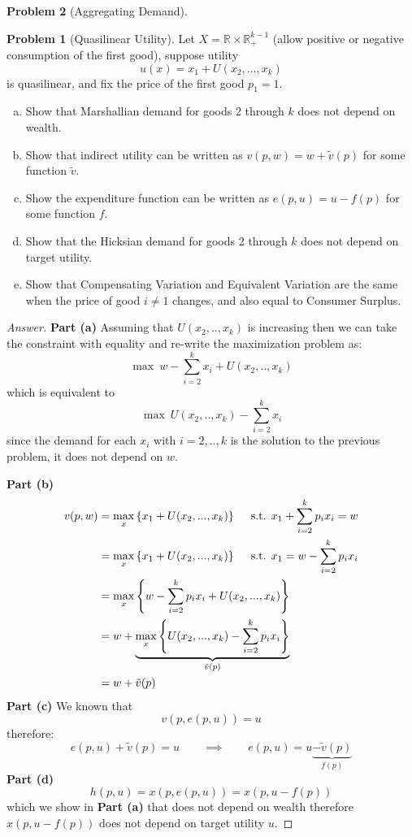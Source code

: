 \documentclass{article}
\theoremstyle{definition}
\newtheorem{problem}{Problem}
\newcommand{\qiq}{\qquad \implies \qquad}
\begin{document}
\begin{problem}[Aggregating Demand]
\begin{problem}[Quasilinear Utility]
Let $X=\mathbb{R} \times \mathbb{R}_{+}^{k-1}$ (allow positive or negative consumption of the first good), suppose utility
$$
u(x)=x_{1}+U\left(x_{2}, \ldots, x_{k}\right)
$$
is quasilinear, and fix the price of the first good $p_{1}=1$.
\begin{enumerate}[(a)]
    \item  Show that Marshallian demand for goods 2 through $k$ does not depend on wealth.
    \item Show that indirect utility can be written as $v(p, w)=w+\tilde{v}(p)$ for some function $\tilde{v}$.
 \item Show the expenditure function can be written as $e(p, u)=u-f(p)$ for some function $f$.
 \item Show that the Hicksian demand for goods 2 through $k$ does not depend on target utility.
 \item Show that Compensating Variation and Equivalent Variation are the same when the price of
    good $i \neq 1$ changes, and also equal to Consumer Surplus.
\end{enumerate}
\end{problem}
\begin{proof}[Answer]
\textbf{Part (a)}
Assuming that $U(x_2,..,x_k)$ is increasing then we can take the constraint with equality and re-write the maximization problem as:
$$\max \: w - \sum_{i=2}^kx_i + U(x_2,..,x_k) $$
which is equivalent to
$$\max \: U(x_2,..,x_k)  - \sum_{i=2}^kx_i $$
since the demand for each $x_i$ with $i=2,..,k$ is the solution to the previous problem, it does not depend on $w$.

\textbf{Part (b)}
\begin{align*}
    v(p,w)&=\max_x\left\{x_1 + U(x_2,...,x_k)\right\} \quad \text{ s.t. } x_1 + \sum_{i=2}^kp_ix_i = w \\
          &=\max_x\left\{x_1 + U(x_2,...,x_k)\right\} \quad \text{ s.t. } x_1  = w -\sum_{i=2}^kp_ix_i\\
          &=\max_x\left\{w -\sum_{i=2}^kp_ix_i + U(x_2,...,x_k)\right\}\\
          &= w + \underbrace{\max_x\left\{ U(x_2,...,x_k) -\sum_{i=2}^kp_ix_i\right\}}_{\Bar{v}(p)}\\
          & = w+\tilde{v}(p)
\end{align*}
\textbf{Part (c)}
We known that
$$v(p,e(p,u)) = u $$
therefore:
$$e(p,u)+\tilde{v}(p) = u \qiq e(p,u) = u \underbrace{-\tilde{v}(p)}_{f(p)}$$
\textbf{Part (d)}
$$h(p,u) = x(p, e(p, u)) = x(p, u - f(p))$$
which we show in \textbf{Part (a)} that does not depend on wealth therefore $x(p, u - f(p))$ does not depend on target utility $u$.


\end{proof}
\end{problem}
\end{document}
